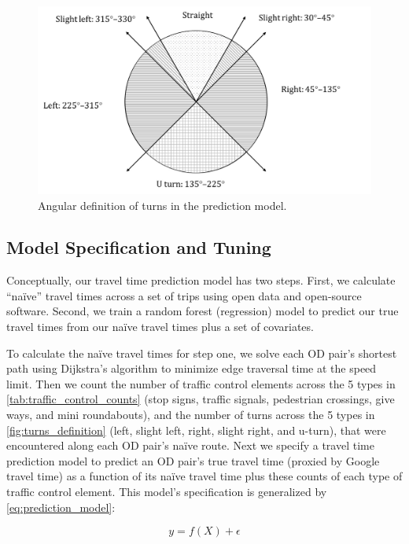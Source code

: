 \documentclass[12pt,letterpaper]{article} %
\begin{document}
\begin{figure}[tb!]
    \centering
    \includegraphics[width=1.0\textwidth]{fig_turns_definition.jpg}
    \caption{Angular definition of turns in the prediction model.}\label{fig:turns_definition}
\end{figure}

\subsection{Model Specification and Tuning}

Conceptually, our travel time prediction model has two steps. First, we calculate \enquote{naïve} travel times across a set of trips using open data and open-source software. Second, we train a random forest (regression) model to predict our true travel times from our naïve travel times plus a set of covariates.

To calculate the naïve travel times for step one, we solve each OD pair's shortest path using Dijkstra's algorithm to minimize edge traversal time at the speed limit. Then we count the number of traffic control elements across the 5 types in \autoref{tab:traffic_control_counts} (stop signs, traffic signals, pedestrian crossings, give ways, and mini roundabouts), and the number of turns across the 5 types in \autoref{fig:turns_definition} (left, slight left, right, slight right, and u-turn), that were encountered along each OD pair's naïve route. Next we specify a travel time prediction model to predict an OD pair's true travel time (proxied by Google travel time) as a function of its naïve travel time plus these counts of each type of traffic control element. This model's specification is generalized by \autoref{eq:prediction_model}:

\begin{equation}
\label{eq:prediction_model}
y = f(X) + \epsilon
\end{equation}
\end{document}
